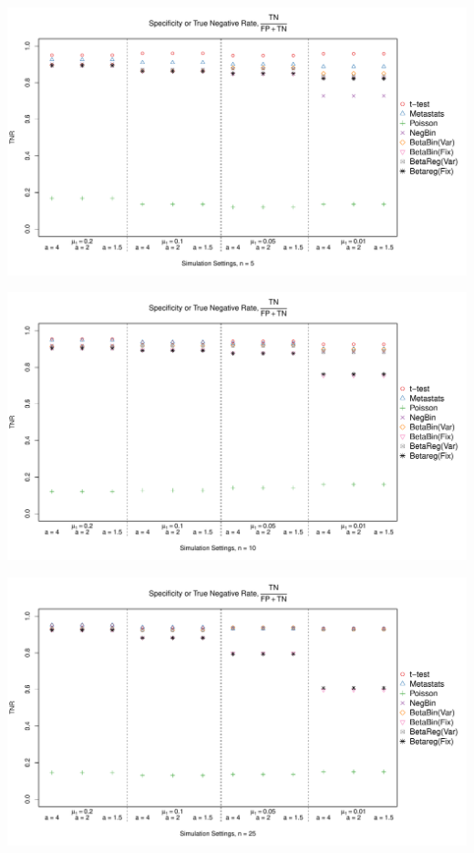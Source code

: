 \documentclass[12pt]{article}\usepackage{graphicx, color}
\makeatletter
\def\maxwidth{ %
  \ifdim\Gin@nat@width>\linewidth
    \linewidth
  \else
    \Gin@nat@width
  \fi
}
\newenvironment{knitrout}{}{} %
\makeatother
\begin{document}
\begin{knitrout}
{}




{\centering \includegraphics[width=\maxwidth]{figure/panelPlots7} 

}




{\centering \includegraphics[width=\maxwidth]{figure/panelPlots8} 

}




{\centering \includegraphics[width=\maxwidth]{figure/panelPlots9} 

}
\end{knitrout}
\end{document}
